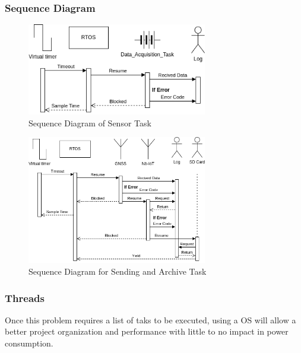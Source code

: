 \subsubsection{Sequence Diagram}

\begin{figure}[H]
    \centering
    \includegraphics[width=0.7\textwidth]{images/diagrams/sequence_diagram/sequence_diagram_1/Sequence Diagram.drawio.png}  %
    \caption{Sequence Diagram of Sensor Task}
    \label{fig:Sequence Diagram of Sensor Task}
\end{figure}

\begin{figure}[H]
    \centering
    \includegraphics[width=0.7\textwidth]{images/diagrams/sequence_diagram/sequence_diagram_2/Sequence Diagram.drawio.png}  %
    \caption{Sequence Diagram for Sending and Archive Task}
    \label{fig:Sequence Diagram for Sending and Archive Task}        
\end{figure}

\subsubsection{Threads} 
Once this problem requires a list of taks to be executed, using a OS will allow
a better project organization and performance with little to no impact in power consumption.

